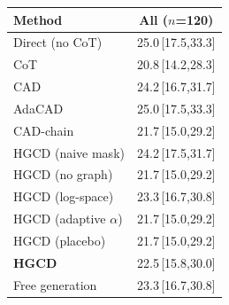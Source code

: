 \begin{tabular}{lc}
\toprule
Method & All ($n$=120) \\
\midrule
Direct (no CoT) & 25.0\,{\scriptsize[17.5,33.3]} \\
CoT & 20.8\,{\scriptsize[14.2,28.3]} \\
CAD & 24.2\,{\scriptsize[16.7,31.7]} \\
AdaCAD & 25.0\,{\scriptsize[17.5,33.3]} \\
CAD-chain & 21.7\,{\scriptsize[15.0,29.2]} \\
HGCD (naive mask) & 24.2\,{\scriptsize[17.5,31.7]} \\
HGCD (no graph) & 21.7\,{\scriptsize[15.0,29.2]} \\
HGCD (log-space) & 23.3\,{\scriptsize[16.7,30.8]} \\
HGCD (adaptive $\alpha$) & 21.7\,{\scriptsize[15.0,29.2]} \\
HGCD (placebo) & 21.7\,{\scriptsize[15.0,29.2]} \\
\textbf{HGCD} & 22.5\,{\scriptsize[15.8,30.0]} \\
Free generation & 23.3\,{\scriptsize[16.7,30.8]} \\
\bottomrule
\end{tabular}
